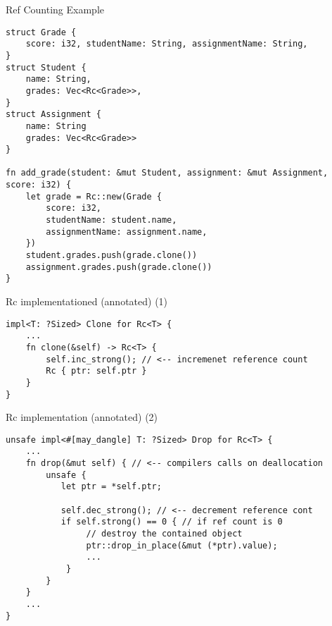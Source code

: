 \begin{frame}[fragile,label=refCountingEx]{Ref Counting Example}
\begin{verbatim}
struct Grade {
    score: i32, studentName: String, assignmentName: String,
}
struct Student {
    name: String,
    grades: Vec<Rc<Grade>>,
}
struct Assignment {
    name: String
    grades: Vec<Rc<Grade>>
}

fn add_grade(student: &mut Student, assignment: &mut Assignment, score: i32) {
    let grade = Rc::new(Grade {
        score: i32,
        studentName: student.name,
        assignmentName: assignment.name,
    })
    student.grades.push(grade.clone())
    assignment.grades.push(grade.clone())
}
\end{verbatim}
\end{frame}


\begin{frame}[fragile,label=rcImplA]{Rc implementationed (annotated) (1)}
\begin{verbatim}
impl<T: ?Sized> Clone for Rc<T> {
    ... 
    fn clone(&self) -> Rc<T> {
        self.inc_strong(); // <-- incremenet reference count
        Rc { ptr: self.ptr }
    }
}
\end{verbatim}
\end{frame}

\begin{frame}[fragile,label=rcImplB]{Rc implementation (annotated) (2)}
\begin{verbatim}
unsafe impl<#[may_dangle] T: ?Sized> Drop for Rc<T> {
    ...
    fn drop(&mut self) { // <-- compilers calls on deallocation
        unsafe {
           let ptr = *self.ptr;

           self.dec_strong(); // <-- decrement reference cont
           if self.strong() == 0 { // if ref count is 0
                // destroy the contained object
                ptr::drop_in_place(&mut (*ptr).value);
                ...
            }
        }
    }
    ...
}
\end{verbatim}
\end{frame}

